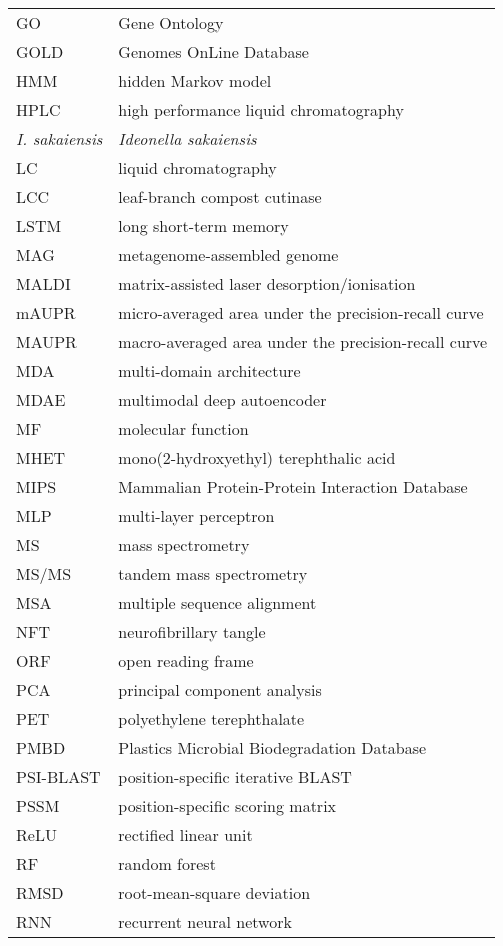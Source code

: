 \begin{longtable}{ll}
    GO & Gene Ontology \\
    GOLD & Genomes OnLine Database \\
    HMM & hidden Markov model \\
    HPLC & high performance liquid chromatography \\
    \emph{I. sakaiensis} & \emph{Ideonella sakaiensis} \\
    LC & liquid chromatography \\
    LCC & leaf-branch compost cutinase \\
    LSTM & long short-term memory \\
    MAG & metagenome-assembled genome \\
    MALDI & matrix-assisted laser desorption/ionisation \\
    mAUPR & micro-averaged area under the precision-recall curve \\
    MAUPR & macro-averaged area under the precision-recall curve \\
    MDA & multi-domain architecture \\
    MDAE & multimodal deep autoencoder \\
    MF & molecular function \\
    MHET & mono(2-hydroxyethyl) terephthalic acid \\
    MIPS & Mammalian Protein-Protein Interaction Database \\
    MLP & multi-layer perceptron \\
    MS & mass spectrometry \\
    MS/MS & tandem mass spectrometry \\
    MSA & multiple sequence alignment \\
    NFT & neurofibrillary tangle \\
    ORF & open reading frame \\
    PCA & principal component analysis \\
    PET & polyethylene terephthalate \\
    PMBD & Plastics Microbial Biodegradation Database \\
    PSI-BLAST & position-specific iterative BLAST \\
    PSSM & position-specific scoring matrix \\
    ReLU & rectified linear unit \\
    RF & random forest \\
    RMSD & root-mean-square deviation \\
    RNN & recurrent neural network \\

\end{longtable}
